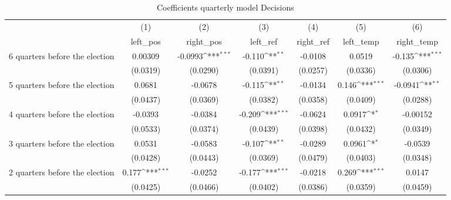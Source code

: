\begin{table}[htbp]\centering
\def\sym#1{\ifmmode^{#1}\else\(^{#1}\)\fi}
\caption{Coefficients quarterly model Decisions}
\begin{tabular}{l*{6}{c}}
\hline\hline
                    &\multicolumn{1}{c}{(1)}&\multicolumn{1}{c}{(2)}&\multicolumn{1}{c}{(3)}&\multicolumn{1}{c}{(4)}&\multicolumn{1}{c}{(5)}&\multicolumn{1}{c}{(6)}\\
                    &\multicolumn{1}{c}{left\_pos}&\multicolumn{1}{c}{right\_pos}&\multicolumn{1}{c}{left\_ref}&\multicolumn{1}{c}{right\_ref}&\multicolumn{1}{c}{left\_temp}&\multicolumn{1}{c}{right\_temp}\\
\hline
 6 quarters before the election&     0.00309         &     -0.0993\sym{***}&      -0.110\sym{**} &     -0.0108         &      0.0519         &      -0.135\sym{***}\\
                    &    (0.0319)         &    (0.0290)         &    (0.0391)         &    (0.0257)         &    (0.0336)         &    (0.0306)         \\
[1em]
 5 quarters before the election&      0.0681         &     -0.0678         &      -0.115\sym{**} &     -0.0134         &       0.146\sym{***}&     -0.0941\sym{**} \\
                    &    (0.0437)         &    (0.0369)         &    (0.0382)         &    (0.0358)         &    (0.0409)         &    (0.0288)         \\
[1em]
 4 quarters before the election&     -0.0393         &     -0.0384         &      -0.209\sym{***}&     -0.0624         &      0.0917\sym{*}  &    -0.00152         \\
                    &    (0.0533)         &    (0.0374)         &    (0.0439)         &    (0.0398)         &    (0.0432)         &    (0.0349)         \\
[1em]
 3 quarters before the election&      0.0531         &     -0.0583         &      -0.107\sym{**} &     -0.0289         &      0.0961\sym{*}  &     -0.0539         \\
                    &    (0.0428)         &    (0.0443)         &    (0.0369)         &    (0.0479)         &    (0.0403)         &    (0.0348)         \\
[1em]
 2 quarters before the election&       0.177\sym{***}&     -0.0252         &      -0.177\sym{***}&     -0.0218         &       0.269\sym{***}&      0.0147         \\
                    &    (0.0425)         &    (0.0466)         &    (0.0402)         &    (0.0386)         &    (0.0359)         &    (0.0459)         \\

\end{tabular}
\end{table}
